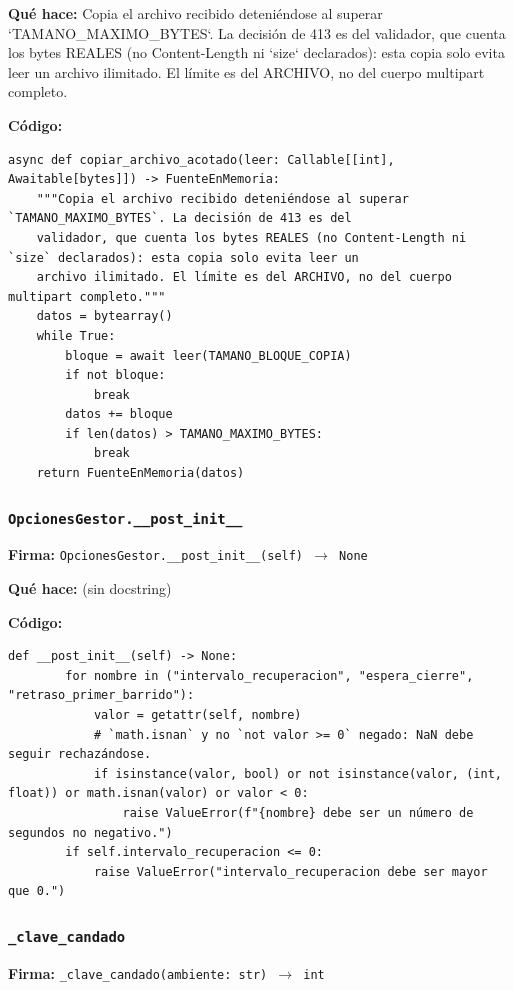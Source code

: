 \documentclass[11pt,a4paper]{article}
\begin{document}
\textbf{Qué hace:} Copia el archivo recibido deteniéndose al superar `TAMANO\_MAXIMO\_BYTES`. La decisión de 413 es del
validador, que cuenta los bytes REALES (no Content-Length ni `size` declarados): esta copia solo evita leer un
archivo ilimitado. El límite es del ARCHIVO, no del cuerpo multipart completo.

\textbf{Código:}
\begin{lstlisting}
async def copiar_archivo_acotado(leer: Callable[[int], Awaitable[bytes]]) -> FuenteEnMemoria:
    """Copia el archivo recibido deteniéndose al superar `TAMANO_MAXIMO_BYTES`. La decisión de 413 es del
    validador, que cuenta los bytes REALES (no Content-Length ni `size` declarados): esta copia solo evita leer un
    archivo ilimitado. El límite es del ARCHIVO, no del cuerpo multipart completo."""
    datos = bytearray()
    while True:
        bloque = await leer(TAMANO_BLOQUE_COPIA)
        if not bloque:
            break
        datos += bloque
        if len(datos) > TAMANO_MAXIMO_BYTES:
            break
    return FuenteEnMemoria(datos)
\end{lstlisting}

\subsubsection*{\texttt{OpcionesGestor.\_\_post\_init\_\_}}
\textbf{Firma:} \texttt{OpcionesGestor.\_\_post\_init\_\_(self) $\rightarrow$ None}

\textbf{Qué hace:} (sin docstring)

\textbf{Código:}
\begin{lstlisting}
def __post_init__(self) -> None:
        for nombre in ("intervalo_recuperacion", "espera_cierre", "retraso_primer_barrido"):
            valor = getattr(self, nombre)
            # `math.isnan` y no `not valor >= 0` negado: NaN debe seguir rechazándose.
            if isinstance(valor, bool) or not isinstance(valor, (int, float)) or math.isnan(valor) or valor < 0:
                raise ValueError(f"{nombre} debe ser un número de segundos no negativo.")
        if self.intervalo_recuperacion <= 0:
            raise ValueError("intervalo_recuperacion debe ser mayor que 0.")
\end{lstlisting}

\subsubsection*{\texttt{\_clave\_candado}}
\textbf{Firma:} \texttt{\_clave\_candado(ambiente: str) $\rightarrow$ int}
\end{document}
